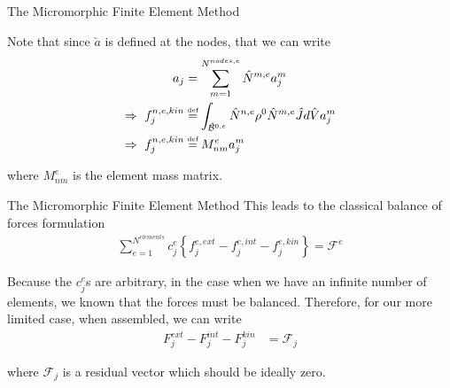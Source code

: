 \documentclass[11pt]{beamer}
\newcommand{\VEC}[1]{\utilde{#1}}
\newcommand\defeq{\mathrel{\stackrel{\makebox[0pt]{\mbox{\normalfont\tiny def}}}{=}}}
\begin{document}
\begin{frame}{The Micromorphic Finite Element Method}

Note that since $\VEC{a}$ is defined at the nodes, that we can write
\begin{align*}
a_j &= \sum_{m=1}^{N^{nodes,e}} \hat{N}^{m,e} a_j^m\\
\Rightarrow\ f_{j}^{n,e,kin} &\defeq \int_{\hat{\mathcal{B}}^{0,e}} \hat{N}^{n,e} \rho^0 \hat{N}^{m,e} \hat{J} d\hat{V} a_j^m\\
\Rightarrow\ f_{j}^{n,e,kin} &\defeq  M_{nm}^e a_j^m
\end{align*}

where $M_{nm}^e$ is the element mass matrix.

\end{frame}

\begin{frame}{The Micromorphic Finite Element Method}
This leads to the classical balance of forces formulation
\begin{align*}
\sum_{e=1}^{N^{elements}} c_j^e\left\{f_{j}^{e,ext} - f_{j}^{e,int} - f_{j}^{e,kin}\right\} = \mathcal{F}^{e}
\end{align*}

Because the $c_j^e$s are arbitrary, in the case when we have an infinite number of elements, we known that the forces must be balanced. Therefore, for our more limited case, when assembled, we can write
\begin{align*}
F_{j}^{ext} - F_{j}^{int} - F_{j}^{kin} &= \mathcal{F}_j
\end{align*}

where $\mathcal{F}_j$ is a residual vector which should be ideally zero.

\end{frame}
\end{document}
